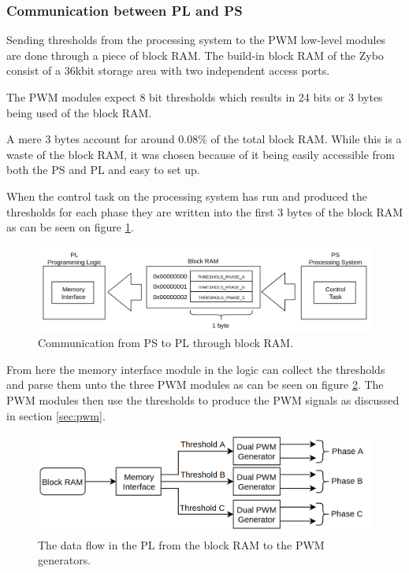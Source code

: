 \subsubsection{Communication between PL and PS}
\label{sec:com_pl_ps}
Sending thresholds from the processing system to the PWM low-level modules are done through a piece of block RAM.
The build-in block RAM of the Zybo consist of a 36kbit storage area with two independent access ports. 

The PWM modules expect 8 bit thresholds which results in 24 bits or 3 bytes being used of the block RAM. 

A mere 3 bytes account for around $0.08\%$ of the total block RAM. While this is a waste of the block RAM, it was chosen because of it being easily accessible from both the PS and PL and easy to set up. 

When the control task on the processing system has run and produced the thresholds for each phase they are written into the first 3 bytes of the block RAM as can be seen on figure \ref{fig:com_pl_to_ps}.

\begin{figure}[H]
	\centering
	\includegraphics[width=1\linewidth]{pictures/software/com_pl_to_ps.png}
	\caption{Communication from PS to PL through block RAM.}
	\label{fig:com_pl_to_ps}
\end{figure}

From here the memory interface module in the logic can collect the thresholds and parse them unto the three PWM modules as can be seen on figure \ref{fig:com_pl}. The PWM modules then use the thresholds to produce the PWM signals as discussed in section \ref{sec:pwm}.


\begin{figure}[H]
	\centering
	\includegraphics[width=0.8\linewidth]{pictures/software/com_pl.png}
	\caption{The data flow in the PL from the block RAM to the PWM generators.}
	\label{fig:com_pl}
\end{figure}


